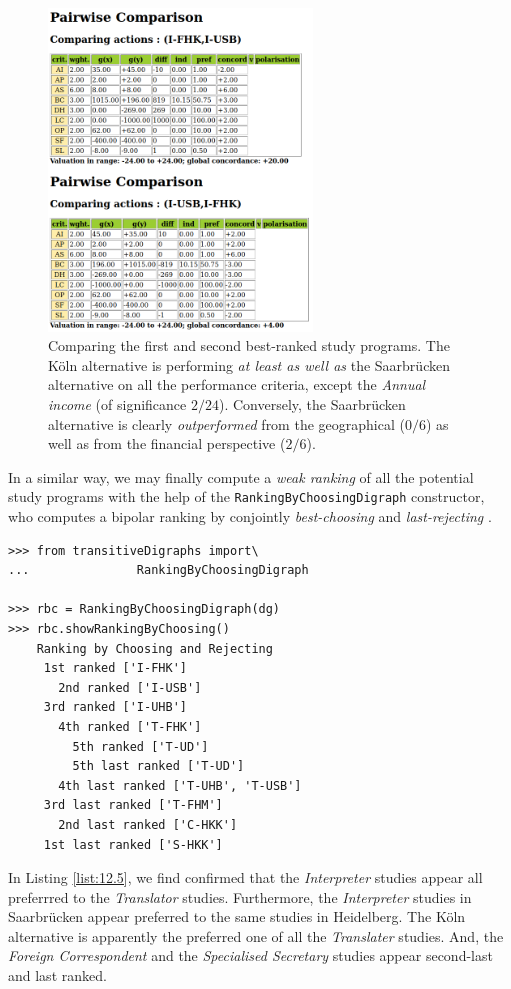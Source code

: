 \begin{figure}[h]
\sidecaption
\includegraphics[width=7cm]{Figures/pairwiseComparison.png}
\caption{Comparing the first and second best-ranked study programs. The Köln alternative is performing \emph{at least as well as} the Saarbrücken alternative on all the performance criteria, except the \emph{Annual income} (of significance $2/24$). Conversely, the Saarbrücken alternative is clearly \emph{outperformed} from the geographical ($0/6$) as well as from the financial perspective ($2/6$).
}
\label{fig:12.6}       %
\end{figure}
\clearpage

In a similar way, we may finally compute a \emph{weak ranking} of all the potential study programs with the help of the \texttt{RankingByChoosingDigraph} constructor, who computes a bipolar ranking by conjointly \emph{best-choosing} and \emph{last-rejecting} \citep{BIS-1999}.

\begin{lstlisting}[caption={Weakly ranking by bipolar best-choosing and last-rejecting},label=list:12.5]
>>> from transitiveDigraphs import\
...               RankingByChoosingDigraph

>>> rbc = RankingByChoosingDigraph(dg)
>>> rbc.showRankingByChoosing()
    Ranking by Choosing and Rejecting
     1st ranked ['I-FHK'] 
       2nd ranked ['I-USB']
	 3rd ranked ['I-UHB']
	   4th ranked ['T-FHK']
	     5th ranked ['T-UD']
	     5th last ranked ['T-UD']
	   4th last ranked ['T-UHB', 'T-USB']
	 3rd last ranked ['T-FHM']
       2nd last ranked ['C-HKK']
     1st last ranked ['S-HKK']
\end{lstlisting}

In Listing \ref{list:12.5}, we find confirmed that the \emph{Interpreter} studies appear all preferrred to the \emph{Translator} studies. Furthermore, the \emph{Interpreter} studies in Saarbrücken appear preferred to the same studies in Heidelberg. The Köln alternative is apparently the preferred one of all the \emph{Translater} studies. And, the \emph{Foreign Correspondent} and the \emph{Specialised Secretary} studies appear second-last and last ranked.

